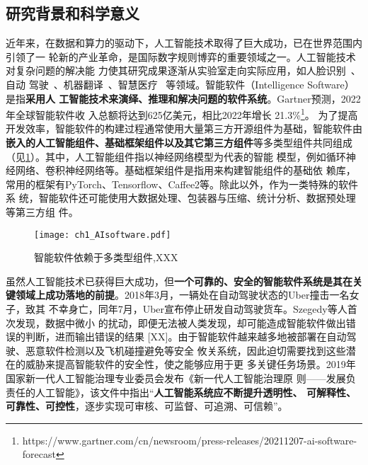 
\subsection{研究背景和科学意义}



%
近年来，在数据和算力的驱动下，人工智能技术取得了巨大成功，已在世界范围内引领了一
轮新的产业革命，是国际数字规则博弈的重要领域之一。人工智能技术对复杂问题的解决能
力使其研究成果逐渐从实验室走向实际应用，如人脸识别~\cite{meng2021magface}、自动
驾驶~\cite{zhang2018deeproad}、机器翻译~\cite{johnson2017google}、智慧医疗
~\cite{zhang2021tau}等领域。智能软件（Intelligence Software）是指\textbf{{采用人
工智能技术来演绎、推理和解决问题的软件系统}}。Gartner预测，2022年全球智能软件收
入总额将达到625亿美元，相比2022年增长
21.3\%\footnote{https://www.gartner.com/cn/newsroom/press-releases/20211207-ai-software-forecast}。
为了提高开发效率，智能软件的构建过程通常使用大量第三方开源组件为基础，智能软件由
\textbf{嵌入的人工智能组件、基础框架组件以及其它第三方组件}等多类型组件共同组成
（见\cref{fig:ch1:aisoftware}）。其中，人工智能组件指以神经网络模型为代表的智能
模型，例如循环神经网络、卷积神经网络等。基础框架组件是指用来构建智能组件的基础依
赖库，常用的框架有PyTorch、Tensorflow、Caffee2等。除此以外，作为一类特殊的软件系
统，智能软件还可能使用大数据处理、包装器与压缩、统计分析、数据预处理等第三方组
件。

\begin{figure}[htp]
    \centering
    \texttt{[image: ch1\_AIsoftware.pdf]}
    \caption{智能软件依赖于多类型组件,XXX}
    \label{fig:ch1:aisoftware}
\end{figure}


虽然人工智能技术已获得巨大成功，但\textbf{一个可靠的、安全的智能软件系统是其在关
键领域上成功落地的前提}。2018年3月，一辆处在自动驾驶状态的Uber撞击一名女子，致其
不幸身亡，同年7月，Uber宣布停止研发自动驾驶货车。Szegedy等人首次发现，数据中微小
的扰动，即便无法被人类发现，却可能造成智能软件做出错误的判断，进而输出错误的结果
[XX]。由于智能软件越来越多地被部署在自动驾驶、恶意软件检测以及飞机碰撞避免等安全
攸关系统，因此迫切需要找到这些潜在的威胁来提高智能软件的安全性，使之能够应用于更
多关键任务场景。2019年国家新一代人工智能治理专业委员会发布《新一代人工智能治理原
则——发展负责任的人工智能》，该文件中指出“\textbf{人工智能系统应不断提升透明性、
可解释性、可靠性、可控性}，逐步实现可审核、可监督、可追溯、可信赖”。

